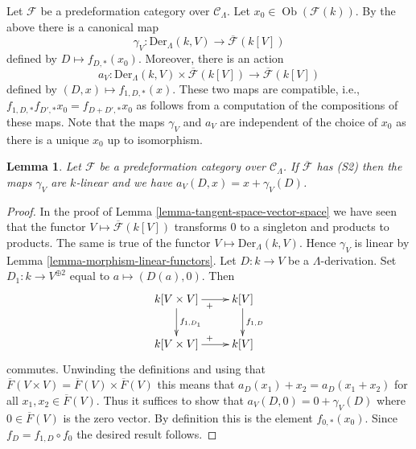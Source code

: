 \documentclass{stacks-project}
\theoremstyle{plain}
\newtheorem{lemma}[subsection]{Lemma}
\theoremstyle{definition}
\theoremstyle{remark}
\numberwithin{equation}{subsection}
\def\Ob{\mathop{\mathrm{Ob}}\nolimits}
\begin{document}
\medskip\noindent
Let $\mathcal{F}$ be a predeformation category over $\mathcal{C}_\Lambda$.
Let $x_0 \in \Ob(\mathcal{F}(k))$. By the above there is a canonical
map
$$
\gamma_V :
\text{Der}_\Lambda(k, V)
\longrightarrow
\overline{\mathcal{F}}(k[V])
$$
defined by $D \mapsto f_{D, *}(x_0)$. Moreover, there is an action
$$
a_V : \text{Der}_\Lambda(k, V) \times \overline{\mathcal{F}}(k[V])
\longrightarrow
\overline{\mathcal{F}}(k[V])
$$
defined by $(D, x) \mapsto f_{1, D, *}(x)$. These two maps are compatible,
i.e., $f_{1, D, *}f_{D', *}x_0 = f_{D + D', *}x_0$ as follows from a
computation of the compositions of these maps. Note that the maps
$\gamma_V$ and $a_V$ are independent of the choice of $x_0$ as there
is a unique $x_0$ up to isomorphism.

\begin{lemma}
\label{lemma-action-linear}
Let $\mathcal{F}$ be a predeformation category over $\mathcal{C}_\Lambda$.
If $\overline{\mathcal{F}}$ has (S2) then the maps $\gamma_V$ are
$k$-linear and we have $a_V(D, x) = x + \gamma_V(D)$.
\end{lemma}

\begin{proof}
In the proof of
Lemma \ref{lemma-tangent-space-vector-space}
we have seen that the functor $V \mapsto \overline{\mathcal{F}}(k[V])$
transforms $0$ to a singleton and products to products. The same is
true of the functor $V \mapsto \text{Der}_\Lambda(k, V)$.
Hence $\gamma_V$ is linear by
Lemma \ref{lemma-morphism-linear-functors}.
Let $D : k \to V$ be a $\Lambda$-derivation.
Set $D_1 : k \to V^{\oplus 2}$ equal to $a \mapsto (D(a), 0)$.
Then
$$
\xymatrix{
k[V \times V] \ar[r]_{+} \ar[d]^{f_{1, D_1}} & k[V] \ar[d]^{f_{1, D}} \\
k[V \times V] \ar[r]^{+} & k[V]
}
$$
commutes. Unwinding the definitions and using that
$\overline{F}(V \times V) = \overline{F}(V) \times \overline{F}(V)$
this means that $a_D(x_1) + x_2 = a_D(x_1 + x_2)$ for all
$x_1, x_2 \in \overline{F}(V)$. Thus it suffices to show that
$a_V(D, 0) = 0 + \gamma_V(D)$ where $0 \in \overline{F}(V)$ is
the zero vector. By definition this is the element $f_{0, *}(x_0)$.
Since $f_D = f_{1, D} \circ f_0$ the desired result follows.
\end{proof}
\end{document}
